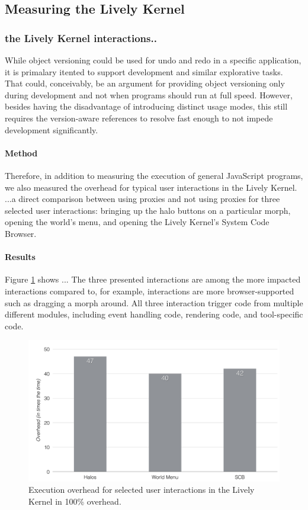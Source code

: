 \subsection{Measuring the Lively Kernel}

\subsubsection{the Lively Kernel interactions..}

While object versioning could be used for undo and redo in a specific application, it is primalary itented to support development and similar explorative tasks.
That could, conceivably, be an argument for providing object versioning only during development and not when programs should run at full speed.
However, besides having the disadvantage of introducing distinct usage modes, this still requires the version-aware references to resolve fast enough to not impede development significantly.

\paragraph{Method}
Therefore, in addition to measuring the execution of general JavaScript programs, we also measured the overhead for typical user interactions in the Lively Kernel.
...a direct comparison between using proxies and not using proxies for three selected user interactions: bringing up the halo buttons on a particular morph, opening the world's menu, and opening the Lively Kernel's System Code Browser.


\paragraph{Results}
Figure \ref{fig:LivelyInteractionsOverhead} shows ...
The three presented interactions are among the more impacted interactions compared to, for example, interactions are more browser-supported such as dragging a morph around.
All three interaction trigger code from multiple different modules, including event handling code, rendering code, and tool-specific code.

\begin{figure}[h]
    \centering
    \includegraphics[width=\textwidth]{figures/6_evaluation/4_LivelyInteractionsOverhead.pdf}
    \caption{Execution overhead for selected user interactions in the Lively Kernel in 100\% overhead.}
    \label{fig:LivelyInteractionsOverhead}
\end{figure}


